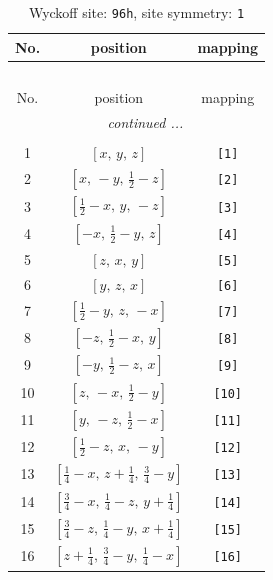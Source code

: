 \documentclass[fleqn,8pt]{jsarticle}
\begin{document}
\begin{longtable}{ccc}
\caption{Wyckoff site: {\tt 96h}, site symmetry: {\tt 1}}
 \\
 \hline \hline
No. & position & mapping \\ \hline \endfirsthead

\multicolumn{2}{l}{\tablename\ \thetable{}} \\
 \hline \hline
No. & position & mapping \\ \hline \endhead

 \hline \hline
\multicolumn{2}{r}{\footnotesize\it continued ...} \\ \endfoot

 \hline \hline
\multicolumn{2}{r}{} \\ \endlastfoot

1 & $\left[ x,\, y,\, z \right]$ & {\tt [1]} \\ \hline
2 & $\left[ x,\, - y,\, \frac{1}{2} - z \right]$ & {\tt [2]} \\ \hline
3 & $\left[ \frac{1}{2} - x,\, y,\, - z \right]$ & {\tt [3]} \\ \hline
4 & $\left[ - x,\, \frac{1}{2} - y,\, z \right]$ & {\tt [4]} \\ \hline
5 & $\left[ z,\, x,\, y \right]$ & {\tt [5]} \\ \hline
6 & $\left[ y,\, z,\, x \right]$ & {\tt [6]} \\ \hline
7 & $\left[ \frac{1}{2} - y,\, z,\, - x \right]$ & {\tt [7]} \\ \hline
8 & $\left[ - z,\, \frac{1}{2} - x,\, y \right]$ & {\tt [8]} \\ \hline
9 & $\left[ - y,\, \frac{1}{2} - z,\, x \right]$ & {\tt [9]} \\ \hline
10 & $\left[ z,\, - x,\, \frac{1}{2} - y \right]$ & {\tt [10]} \\ \hline
11 & $\left[ y,\, - z,\, \frac{1}{2} - x \right]$ & {\tt [11]} \\ \hline
12 & $\left[ \frac{1}{2} - z,\, x,\, - y \right]$ & {\tt [12]} \\ \hline
13 & $\left[ \frac{1}{4} - x,\, z + \frac{1}{4},\, \frac{3}{4} - y \right]$ & {\tt [13]} \\ \hline
14 & $\left[ \frac{3}{4} - x,\, \frac{1}{4} - z,\, y + \frac{1}{4} \right]$ & {\tt [14]} \\ \hline
15 & $\left[ \frac{3}{4} - z,\, \frac{1}{4} - y,\, x + \frac{1}{4} \right]$ & {\tt [15]} \\ \hline
16 & $\left[ z + \frac{1}{4},\, \frac{3}{4} - y,\, \frac{1}{4} - x \right]$ & {\tt [16]} \\ \hline

\end{longtable}
\end{document}
